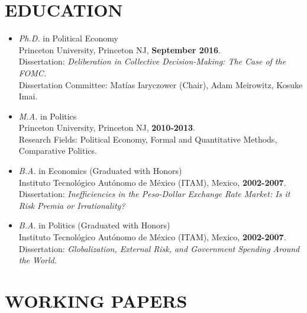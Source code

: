\documentclass[margin, 10pt]{res} %
\begin{document}
\begin{resume}
\section{EDUCATION}
\begin{itemize} \itemsep -2pt
\item[-] {\sl Ph.D.} in Political Economy  \\
Princeton University, Princeton NJ, \textbf{September 2016}. \\
Dissertation: \emph{Deliberation in Collective
  Decision-Making: The Case of the FOMC.}\\
 Dissertation Committee: Mat\'{i}as Iaryczower (Chair), Adam Meirowitz, Kosuke Imai.\\
\item[-] {\sl M.A.} in Politics   \\
Princeton University, Princeton NJ, \textbf{2010-2013}. \\
Research Fields: Political Economy, Formal and Quantitative Methods,
Comparative Politics.\\
\item[-] {\sl B.A.} in Economics (Graduated with Honors)\\
Instituto Tecnol\'{o}gico Aut\'{o}nomo de M\'{e}xico (ITAM), Mexico, \textbf{2002-2007}. \\
Dissertation: \emph{Inefficiencies in the Peso-Dollar Exchange Rate
  Market: Is it Risk Premia or Irrationality?}\\
\item[-] {\sl B.A.} in Politics (Graduated with Honors)   \\
Instituto Tecnol\'{o}gico Aut\'{o}nomo de M\'{e}xico (ITAM), Mexico, \textbf{2002-2007}. \\
Dissertation: \emph{Globalization, External Risk, and Government
  Spending Around the World.}\\
\end{itemize}


\section{WORKING PAPERS}
\begin{itemize} \itemsep -2pt


\end{itemize}
\end{resume}
\end{document}
